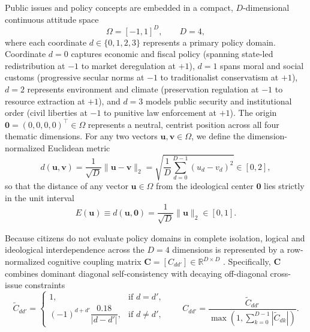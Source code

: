\documentclass{article}
\begin{document}
Public issues and policy concepts are embedded in a compact, $D$-dimensional continuous attitude space
\begin{equation}
    \Omega = [-1, 1]^D, \qquad D = 4,
    \label{eq:concept_space}
\end{equation}
where each coordinate $d \in \{0, 1, 2, 3\}$ represents a primary policy domain. Coordinate $d = 0$ captures economic and fiscal policy (spanning state-led redistribution at $-1$ to market deregulation at $+1$), $d = 1$ spans moral and social customs (progressive secular norms at $-1$ to traditionalist conservatism at $+1$), $d = 2$ represents environment and climate (preservation regulation at $-1$ to resource extraction at $+1$), and $d = 3$ models public security and institutional order (civil liberties at $-1$ to punitive law enforcement at $+1$). The origin $\mathbf{0} = (0, 0, 0, 0)^\top \in \Omega$ represents a neutral, centrist position across all four thematic dimensions. For any two vectors $\mathbf{u}, \mathbf{v} \in \Omega$, we define the dimension-normalized Euclidean metric
\begin{equation}
    d(\mathbf{u}, \mathbf{v}) = \frac{1}{\sqrt{D}} \|\mathbf{u} - \mathbf{v}\|_2 = \sqrt{\frac{1}{D} \sum_{d=0}^{D-1} (u_d - v_d)^2} \in [0, 2],
    \label{eq:normalized_metric}
\end{equation}
so that the distance of any vector $\mathbf{u} \in \Omega$ from the ideological center $\mathbf{0}$ lies strictly in the unit interval
\begin{equation}
    E(\mathbf{u}) \equiv d(\mathbf{u}, \mathbf{0}) = \frac{1}{\sqrt{D}} \|\mathbf{u}\|_2 \in [0, 1].
    \label{eq:distance_to_center}
\end{equation}

Because citizens do not evaluate policy domains in complete isolation, logical and ideological interdependence across the $D = 4$ dimensions is represented by a row-normalized cognitive coupling matrix $\mathbf{C} = [C_{dd'}] \in \mathbb{R}^{D \times D}$ \citep{converse1964nature, friedkin2016network}. Specifically, $\mathbf{C}$ combines dominant diagonal self-consistency with decaying off-diagonal cross-issue constraints
\begin{equation}
    \tilde{C}_{dd'} =
    \begin{cases}
        1, & \text{if } d = d', \\[4pt]
        (-1)^{d + d'} \dfrac{0.18}{|d - d'|}, & \text{if } d \neq d',
    \end{cases}
    \qquad
    C_{dd'} = \frac{\tilde{C}_{dd'}}{\max\!\left(1, \sum_{k=0}^{D-1} |\tilde{C}_{dk}|\right)}.
    \label{eq:coupling_matrix}
\end{equation}
\end{document}
